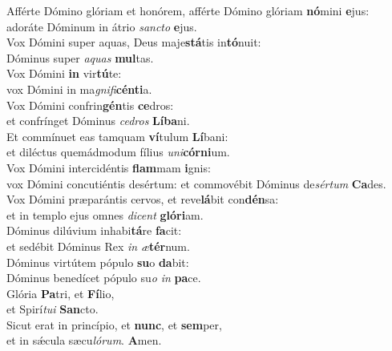 \evenverse Afférte Dómino glóriam et honórem, afférte Dómino glóriam \textbf{nó}mini \textbf{e}jus:~\*\\
\evenverse adoráte Dóminum in átrio \textit{san}\textit{cto} \textbf{e}jus.\\
\oddverse Vox Dómini super aquas, Deus maje\textbf{stá}tis in\textbf{tó}nuit:~\*\\
\oddverse Dóminus super \textit{a}\textit{quas} \textbf{mul}tas.\\
\evenverse Vox Dómini \textbf{in} vir\textbf{tú}te:~\*\\
\evenverse vox Dómini in ma\textit{gni}\textit{fi}\textbf{cén}\textbf{ti}a.\\
\oddverse Vox Dómini confrin\textbf{gén}tis \textbf{ce}dros:~\*\\
\oddverse et confrínget Dóminus \textit{ce}\textit{dros} \textbf{Lí}\textbf{ba}ni.\\
\evenverse Et commínuet eas tamquam \textbf{ví}tulum \textbf{Lí}bani:~\*\\
\evenverse et diléctus quemádmodum fílius \textit{u}\textit{ni}\textbf{cór}\textbf{ni}um.\\
\oddverse Vox Dómini intercidéntis \textbf{flam}mam \textbf{i}gnis:~\*\\
\oddverse vox Dómini concutiéntis desértum: et commovébit Dóminus de\textit{sér}\textit{tum} \textbf{Ca}des.\\
\evenverse Vox Dómini præparántis cervos, et reve\textbf{lá}bit con\textbf{dén}sa:~\*\\
\evenverse et in templo ejus omnes \textit{di}\textit{cent} \textbf{gló}\textbf{ri}am.\\
\oddverse Dóminus dilúvium inhabi\textbf{tá}re \textbf{fa}cit:~\*\\
\oddverse et sedébit Dóminus Rex \textit{in} \textit{æ}\textbf{tér}num.\\
\evenverse Dóminus virtútem pópulo \textbf{su}o \textbf{da}bit:~\*\\
\evenverse Dóminus benedícet pópulo su\textit{o} \textit{in} \textbf{pa}ce.\\
\oddverse Glória \textbf{Pa}tri, et \textbf{Fí}lio,~\*\\
\oddverse et Spirí\textit{tu}\textit{i} \textbf{San}cto.\\
\evenverse Sicut erat in princípio, et \textbf{nunc}, et \textbf{sem}per,~\*\\
\evenverse et in sǽcula sæcu\textit{ló}\textit{rum}. \textbf{A}men.\\
